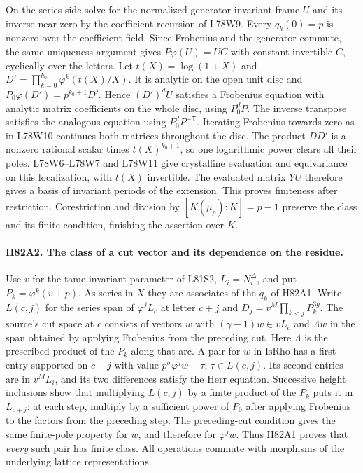 On the series side solve for the normalized generator-invariant
frame $U$ and its inverse near zero by the coefficient recursion
of L78W9. Every $q_k(0)=p$ is nonzero over the coefficient field.
Since Frobenius and the generator commute, the same uniqueness
argument gives $P\varphi(U)=U C$ with constant invertible $C$,
cyclically over the letters. Let $t(X)=\log(1+X)$ and
$D'=\prod_{k=0}^{k_0}\varphi^k(t(X)/X)$. It is analytic on the
open unit disc and
$P_0\varphi(D')=p^{k_0+1}D'$.
Hence $(D')^d U$ satisfies a Frobenius equation with analytic
matrix coefficients on the whole disc, using $P_0^dP$.
The inverse transpose satisfies the analogous equation using
$P_0^dP^{-\mathsf T}$. Iterating Frobenius towards zero as in
L78W10 continues both matrices throughout the disc.
The product $D D'$ is a nonzero rational scalar times
$t(X)^{k_0+1}$, so one logarithmic power clears all their poles.
L78W6--L78W7 and L78W11 give crystalline evaluation and
equivariance on this localization, with $t(X)$ invertible.
The evaluated matrix $YU$
therefore gives a basis of invariant periods of the extension.
This proves finiteness after restriction. Corestriction and
division by $[K(\mu_p):K]=p-1$ preserve the class and its finite
condition, finishing the assertion over $K$.

\paragraph{H82A2. The class of a cut vector and its dependence on the residue.}
Use $v$ for the tame invariant parameter of L81S2, $L_i=N_i^\Delta$,
and put $P_k=\varphi^k(v+p)$. As series in $X$ they are associates
of the $q_k$ of H82A1. Write $L(c,j)$ for the series span of
$\varphi^j L_c$ at letter $c+j$ and
$D_j=v^M\prod_{k<j}P_k^{3g}$. The source's cut space at $c$
consists of vectors $w$ with $(\gamma-1)w\in vL_c$ and
$\Lambda w$ in the span obtained by applying Frobenius from the
preceding cut. Here $\Lambda$ is the prescribed product of
the $P_k$ along that arc. A pair for $w$ in $\mathrm{IsRho}$ has
a first entry supported on $c+j$ with value
$p^\sigma\varphi^j w-\tau$, $\tau\in L(c,j)$. Its second entries
are in $v^M L_i$, and its two differences satisfy the Herr equation.
Successive height inclusions show that multiplying
$L(c,j)$ by a finite product of the $P_k$ puts it in $L_{c+j}$:
at each step, multiply by a sufficient power of $P_0$ after
applying Frobenius to the factors from the preceding step.
The preceding-cut condition gives the same finite-pole property
for $w$, and therefore for $\varphi^j w$. Thus H82A1 proves that
\emph{every} such pair has finite class. All operations commute
with morphisms of the underlying lattice representations.

